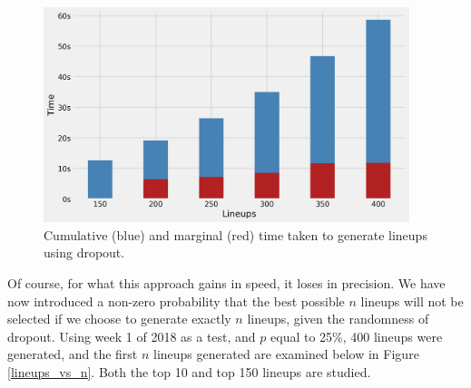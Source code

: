 \documentclass[12pt]{article}
\begin{document}
\begin{figure}[H]
  \centering
  \includegraphics[width=0.95\textwidth]{../figures/time_per_lineup_dropout}
  \caption{Cumulative (blue) and marginal (red) time taken to generate lineups using dropout.}
  \label{lineup times using dropout}
\end{figure}

Of course, for what this approach gains in speed, it loses in precision. We have now introduced a non-zero probability that the best possible $n$ lineups will not be selected if we choose to generate exactly $n$ lineups, given the randomness of dropout. Using week 1 of 2018 as a test, and $p$ equal to 25\%, 400 lineups were generated, and the first $n$ lineups generated are examined below in Figure \ref{lineups_vs_n}. Both the top 10 and top 150 lineups are studied.  
\end{document}
